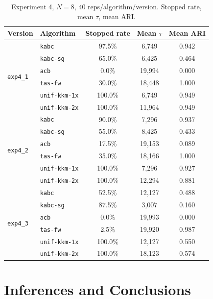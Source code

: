 \documentclass[11pt]{article}
\begin{document}
\begin{table}[h]
\centering
\caption{Experiment 4, $N=8$, 40 reps/algorithm/version. Stopped rate, mean $\tau$, mean ARI.}
\begin{tabular}{llccc}
\toprule
Version & Algorithm & Stopped rate & Mean $\tau$ & Mean ARI \\
\midrule
\multirow{6}{*}{\texttt{exp4\_1}}
 & \texttt{kabc}        &  97.5\% &  6{,}749 & 0.942 \\
 & \texttt{kabc-sg}     &  65.0\% &  6{,}425 & 0.464 \\
 & \texttt{acb}         &   0.0\% & 19{,}994 & 0.000 \\
 & \texttt{tas-fw}      &  30.0\% & 18{,}448 & 1.000 \\
 & \texttt{unif-kkm-1x} & 100.0\% &  6{,}749 & 0.949 \\
 & \texttt{unif-kkm-2x} & 100.0\% & 11{,}964 & 0.949 \\
\midrule
\multirow{6}{*}{\texttt{exp4\_2}}
 & \texttt{kabc}        &  90.0\% &  7{,}296 & 0.937 \\
 & \texttt{kabc-sg}     &  55.0\% &  8{,}425 & 0.433 \\
 & \texttt{acb}         &  17.5\% & 19{,}153 & 0.089 \\
 & \texttt{tas-fw}      &  35.0\% & 18{,}166 & 1.000 \\
 & \texttt{unif-kkm-1x} & 100.0\% &  7{,}296 & 0.927 \\
 & \texttt{unif-kkm-2x} & 100.0\% & 12{,}294 & 0.881 \\
\midrule
\multirow{6}{*}{\texttt{exp4\_3}}
 & \texttt{kabc}        &  52.5\% & 12{,}127 & 0.488 \\
 & \texttt{kabc-sg}     &  87.5\% &  3{,}007 & 0.160 \\
 & \texttt{acb}         &   0.0\% & 19{,}993 & 0.000 \\
 & \texttt{tas-fw}      &   2.5\% & 19{,}920 & 0.987 \\
 & \texttt{unif-kkm-1x} & 100.0\% & 12{,}127 & 0.550 \\
 & \texttt{unif-kkm-2x} & 100.0\% & 18{,}123 & 0.574 \\
\bottomrule
\end{tabular}
\label{tab:exp4-summary}
\end{table}

\FloatBarrier
\section{Inferences and Conclusions}
\label{sec:conclusions}
\end{document}
